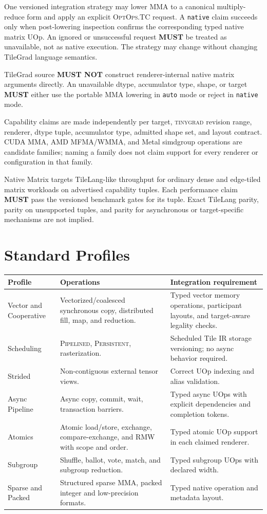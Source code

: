\documentclass[10pt,letterpaper]{article}
\newcommand{\tinygrad}{\textsc{tinygrad}}
\newcommand{\op}[1]{\textsc{#1}}
\newcommand{\must}{\textbf{MUST}}
\newcommand{\mustnot}{\textbf{MUST NOT}}
\begin{document}
One versioned integration strategy may lower \op{MMA} to a canonical
multiply-reduce form and apply an explicit \op{OptOps.TC} request. A
\texttt{native} claim succeeds only when post-lowering inspection confirms the
corresponding typed native matrix UOp. An ignored or unsuccessful request
\must{} be treated as unavailable, not as native execution. The strategy may
change without changing TileGrad language semantics.

TileGrad source \mustnot{} construct renderer-internal native matrix arguments
directly. An unavailable dtype, accumulator type, shape, or target \must{} either
use the portable \op{MMA} lowering in \texttt{auto} mode or reject in
\texttt{native} mode.

Capability claims are made independently per target, \tinygrad{} revision
range, renderer, dtype tuple, accumulator type, admitted shape set, and layout
contract. CUDA MMA, AMD MFMA/WMMA, and Metal simdgroup operations are candidate
families; naming a family does not claim support for every renderer or
configuration in that family.

Native Matrix targets TileLang-like throughput for ordinary dense and
edge-tiled matrix workloads on advertised capability tuples. Each performance
claim \must{} pass the versioned benchmark gates for its tuple. Exact TileLang
parity, parity on unsupported tuples, and parity for asynchronous or
target-specific mechanisms are not implied.

\section*{Standard Profiles}

\begin{center}
\begin{tabularx}{\textwidth}{@{}lYY@{}}
\toprule
\textbf{Profile} & \textbf{Operations} & \textbf{Integration requirement} \\
\midrule
Vector and Cooperative & Vectorized/coalesced synchronous copy, distributed
fill, map, and reduction. & Typed vector memory operations, participant layouts,
and target-aware legality checks. \\
Scheduling & \op{Pipelined}, \op{Persistent}, rasterization. & Scheduled Tile
IR storage versioning; no async behavior required. \\
Strided & Non-contiguous external tensor views. & Correct UOp indexing and
alias validation. \\
Async Pipeline & Async copy, commit, wait, transaction barriers. & Typed async
UOps with explicit dependencies and completion tokens. \\
Atomics & Atomic load/store, exchange, compare-exchange, and RMW with scope and
order. & Typed atomic UOp support in each claimed renderer. \\
Subgroup & Shuffle, ballot, vote, match, and subgroup reduction. & Typed
subgroup UOps with declared width. \\
Sparse and Packed & Structured sparse MMA, packed integer and low-precision
formats. & Typed native operation and metadata layout. \\
\bottomrule
\end{tabularx}
\end{center}
\end{document}
